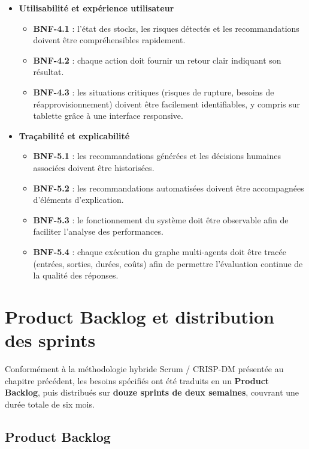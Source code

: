 \begin{itemize}[label=--]
    \item \textbf{Utilisabilité et expérience utilisateur}
    \begin{itemize}[label=$\bullet$]
        \item \textbf{BNF-4.1} : l'état des stocks, les risques détectés et les recommandations doivent être compréhensibles rapidement.
        \item \textbf{BNF-4.2} : chaque action doit fournir un retour clair indiquant son résultat.
        \item \textbf{BNF-4.3} : les situations critiques (risques de rupture, besoins de réapprovisionnement) doivent être facilement identifiables, y compris sur tablette grâce à une interface responsive.
    \end{itemize}

    \item \textbf{Traçabilité et explicabilité}
    \begin{itemize}[label=$\bullet$]
        \item \textbf{BNF-5.1} : les recommandations générées et les décisions humaines associées doivent être historisées.
        \item \textbf{BNF-5.2} : les recommandations automatisées doivent être accompagnées d'éléments d'explication.
        \item \textbf{BNF-5.3} : le fonctionnement du système doit être observable afin de faciliter l'analyse des performances.
        \item \textbf{BNF-5.4} : chaque exécution du graphe multi-agents doit être tracée (entrées, sorties, durées, coûts) afin de permettre l'évaluation continue de la qualité des réponses.
    \end{itemize}
\end{itemize}

\section{Product Backlog et distribution des sprints}

Conformément à la méthodologie hybride Scrum / CRISP-DM présentée au chapitre précédent, les besoins spécifiés ont été traduits en un \textbf{Product Backlog}, puis distribués sur \textbf{douze sprints de deux semaines}, couvrant une durée totale de six mois.

\subsection{Product Backlog}

